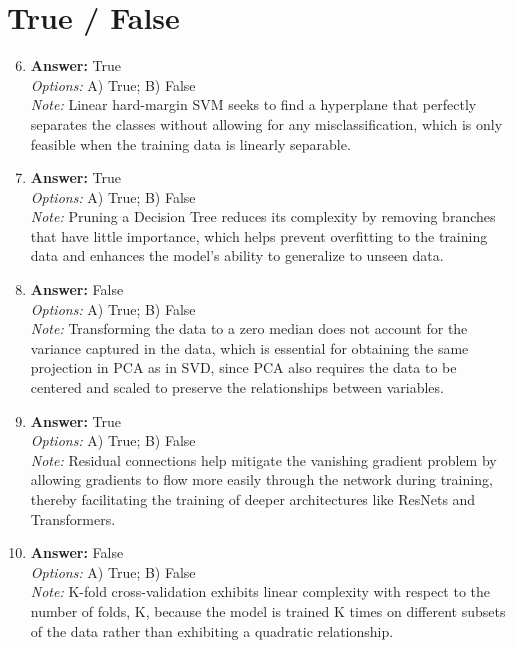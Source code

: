 \documentclass[12pt]{article}
\begin{document}
\section*{True / False}
\begin{enumerate}[label=\arabic*.]
\setcounter{enumi}{5}
\item \textbf{Answer:} True
\\ \textit{Options:} A) True; B) False
\\ \textit{Note:} Linear hard-margin SVM seeks to find a hyperplane that perfectly separates the classes without allowing for any misclassification, which is only feasible when the training data is linearly separable.
\item \textbf{Answer:} True
\\ \textit{Options:} A) True; B) False
\\ \textit{Note:} Pruning a Decision Tree reduces its complexity by removing branches that have little importance, which helps prevent overfitting to the training data and enhances the model's ability to generalize to unseen data.
\item \textbf{Answer:} False
\\ \textit{Options:} A) True; B) False
\\ \textit{Note:} Transforming the data to a zero median does not account for the variance captured in the data, which is essential for obtaining the same projection in PCA as in SVD, since PCA also requires the data to be centered and scaled to preserve the relationships between variables.
\item \textbf{Answer:} True
\\ \textit{Options:} A) True; B) False
\\ \textit{Note:} Residual connections help mitigate the vanishing gradient problem by allowing gradients to flow more easily through the network during training, thereby facilitating the training of deeper architectures like ResNets and Transformers.
\item \textbf{Answer:} False
\\ \textit{Options:} A) True; B) False
\\ \textit{Note:} K-fold cross-validation exhibits linear complexity with respect to the number of folds, K, because the model is trained K times on different subsets of the data rather than exhibiting a quadratic relationship.
\end{enumerate}
\end{document}
